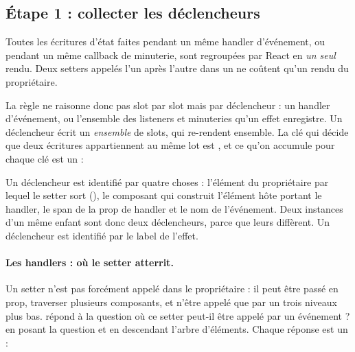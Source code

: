 \subsection{Étape 1 : collecter les déclencheurs}

\begin{react}[batching]
Toutes les écritures d'état faites pendant un même handler d'événement, ou pendant un même
callback de minuterie, sont regroupées par React en \emph{un seul} rendu. Deux setters appelés
l'un après l'autre dans un  ne coûtent qu'un rendu du propriétaire.
\end{react}

La règle ne raisonne donc pas slot par slot mais  par déclencheur : un handler
d'événement, ou l'ensemble des listeners et minuteries qu'un effet enregistre. Un déclencheur
écrit un \emph{ensemble} de slots, qui re-rendent ensemble. La clé qui décide que deux écritures
appartiennent au même lot est , et ce qu'on accumule pour chaque clé est un
 :


Un déclencheur  est identifié par quatre choses : l'élément du propriétaire par
lequel le setter sort (), le composant qui construit l'élément hôte portant le handler,
le span de la prop de handler et le nom de l'événement. Deux instances d'un même enfant sont donc
deux déclencheurs, parce que leurs  diffèrent. Un déclencheur  est
identifié par le label de l'effet.

\paragraph{Les handlers : où le setter atterrit.} Un setter n'est pas forcément appelé dans le
propriétaire : il peut être passé en prop, traverser plusieurs composants, et n'être appelé que
par un  trois niveaux plus bas.  répond à la question
\og où ce setter peut-il être appelé par un événement ?\fg{} en posant la question
 et en descendant l'arbre d'éléments. Chaque réponse est un
 :


